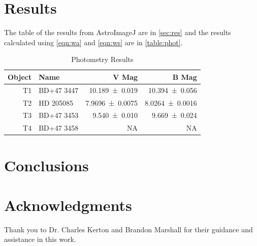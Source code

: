 \documentclass[%
aip,
jmp,
reprint,
floatfix
]{revtex4-1}
\begin{document}

	\section{Results}

	The table of the results from AstroImageJ are in \autoref{sec:res} and the results calculated using \autoref{eqn:wa} and \autoref{eqn:ws} are in \autoref{table:phot}. 

	\begin{table}
		\centering
		\caption{Photometry Results}
		\begin{tabular*}{0.9\linewidth}{@{\extracolsep{\fill}}rlrr}
			\hline
			Object & Name       &                  V Mag &                  B Mag \\ \hline\hline
			    T1 & BD+47 3447 &  \SI{10.189\pm0.019}{} &  \SI{10.394\pm0.056}{} \\
			    T2 & HD 205085  & \SI{7.9696\pm0.0075}{} & \SI{8.0264\pm0.0016}{} \\
			    T3 & BD+47 3453 &    \SI{9.540\pm.010}{} &   \SI{9.669\pm0.024}{} \\
			    T4 & BD+47 3458 &                     NA &                     NA \\ \hline
		\end{tabular*}
		\label{table:phot}
	\end{table}


	\section{Conclusions}



	\section*{Acknowledgments}

	Thank you to Dr. Charles Kerton and Brandon Marshall for their guidance and assistance in this work.
\end{document}
